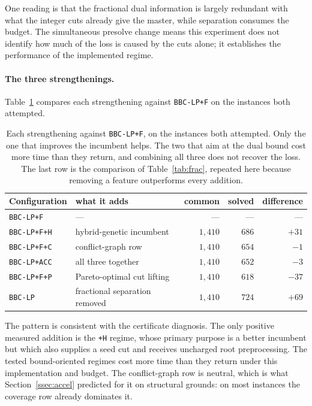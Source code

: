 One reading is that the fractional dual information is largely redundant with what the
integer cuts already give the master, while separation consumes the budget. The
simultaneous presolve change means this experiment does not identify how much of the
loss is caused by the cuts alone; it establishes the performance of the implemented
regime.

\paragraph{The three strengthenings.}
Table~\ref{tab:ablation} compares each strengthening against \texttt{BBC-LP+F} on the
instances both attempted.

\begin{table}[h]\centering
\footnotesize
\begin{tabular}{@{}llrrr@{}}
\toprule
Configuration & what it adds & common & solved & difference\\
\midrule
\texttt{BBC-LP+F}   & ---                        & ---       & ---   & ---\\
\texttt{BBC-LP+F+H} & hybrid-genetic incumbent   & $1{,}410$ & $686$ & $+31$\\
\texttt{BBC-LP+F+C} & conflict-graph row         & $1{,}410$ & $654$ & $-1$\\
\texttt{BBC-LP+ACC} & all three together         & $1{,}410$ & $652$ & $-3$\\
\texttt{BBC-LP+F+P} & Pareto-optimal cut lifting & $1{,}410$ & $618$ & $-37$\\
\midrule
\texttt{BBC-LP}     & fractional separation removed & $1{,}410$ & $724$ & $+69$\\
\bottomrule
\end{tabular}
\caption{Each strengthening against \texttt{BBC-LP+F}, on the instances both attempted.
Only the one that improves the incumbent helps. The two that aim at the dual bound
cost more time than they return, and combining all three does not recover the loss.
The last row is the comparison of Table~\ref{tab:frac}, repeated here because removing
a feature outperforms every addition.}
\label{tab:ablation}
\end{table}

The pattern is consistent with the certificate diagnosis. The only positive measured
addition is the \texttt{+H} regime, whose primary purpose is a better incumbent but
which also supplies a seed cut and receives uncharged root preprocessing. The tested
bound-oriented regimes cost more time than they return under this implementation and
budget. The conflict-graph row
is neutral, which is what Section~\ref{ssec:accel} predicted for it on structural
grounds: on most instances the coverage row already dominates it.

